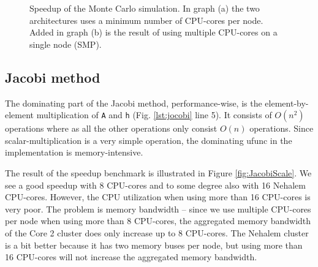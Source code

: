 \documentclass{sigplanconf}
\begin{document}
\begin{figure}[t]%
  \begin{center}%
    \caption{Speedup of the Monte Carlo simulation. In graph (a) the two architectures uses a minimum number of CPU-cores per node. Added in graph (b) is the result of using multiple CPU-cores on a single node (SMP).}%
    \label{fig:MonteCarlo}%
  \end{center}
\end{figure}


\subsection{Jacobi method}
The dominating part of the Jacobi method, performance-wise, is the element-by-element multiplication of \texttt{A} and \texttt{h} (Fig. \ref{lst:jocobi} line 5). It consists of $O(n^2)$ operations where as all the other operations only consist $O(n)$ operations. Since scalar-multiplication is a very simple operation, the dominating ufunc in the implementation is memory-intensive.

The result of the speedup benchmark is illustrated in Figure \ref{fig:JacobiScale}. We see a good speedup with 8 CPU-cores and to some degree also with 16 Nehalem CPU-cores. However, the CPU utilization when using more than 16 CPU-cores is very poor. The problem is memory bandwidth -- since we use multiple CPU-cores per node when using more than 8 CPU-cores, the aggregated memory bandwidth of the Core 2 cluster does only increase up to 8 CPU-cores. The Nehalem cluster is a bit better because it has two memory buses per node, but using more than 16 CPU-cores will not increase the aggregated memory bandwidth.
\end{document}
